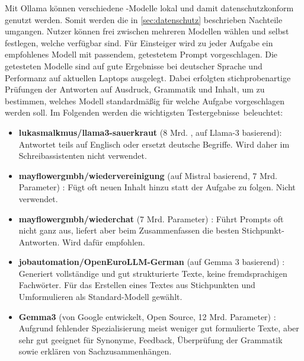 \documentclass[../main.tex]{subfiles}
\begin{document}
Mit Ollama können verschiedene -Modelle lokal und damit datenschutzkonform genutzt werden. Somit werden die in \autoref{sec:datenschutz} beschrieben Nachteile umgangen. 
Nutzer können frei zwischen mehreren Modellen wählen und selbst festlegen, welche verfügbar sind. Für Einsteiger wird zu jeder Aufgabe ein empfohlenes Modell mit passendem, 
getestetem Prompt vorgeschlagen. Die getesteten Modelle sind auf gute Ergebnisse bei deutscher Sprache und Performanz auf aktuellen Laptops ausgelegt. Dabei erfolgten stichprobenartige 
Prüfungen der Antworten auf Ausdruck, Grammatik und Inhalt, um zu bestimmen, welches Modell standardmäßig für welche Aufgabe vorgeschlagen werden soll. Im Folgenden werden die wichtigsten \mbox{Testergebnisse beleuchtet:}

\begin{itemize} \item \textbf{lukasmalkmus/llama3-sauerkraut} (8 Mrd. , auf Llama-3 basierend)\cite{sauerkraut}: Antwortet teils auf Englisch oder ersetzt deutsche Begriffe. Wird daher im Schreibassistenten nicht verwendet.

\item \textbf{mayflowergmbh/wiedervereinigung} (auf Mistral basierend, 7 Mrd. Parameter) \cite{wiedervereinigung}: Fügt oft neuen Inhalt hinzu statt der Aufgabe zu folgen. Nicht verwendet.

\item \textbf{mayflowergmbh/wiederchat} (7 Mrd. Parameter) \cite{wiederchat}: Führt Prompts oft nicht ganz aus, liefert aber beim Zusammenfassen die besten Stichpunkt-Antworten. Wird dafür empfohlen.

\item \textbf{jobautomation/OpenEuroLLM-German} (auf Gemma 3 basierend) \cite{openeurollm}: Generiert vollständige und gut strukturierte Texte, keine fremdsprachigen Fachwörter. Für das Erstellen eines Textes aus Stichpunkten und Umformulieren als Standard-Modell gewählt.

\item \textbf{Gemma3} (von Google entwickelt, Open Source, 12 Mrd. Parameter) \cite{gemma3}: Aufgrund fehlender Spezialisierung meist weniger gut formulierte Texte, aber sehr gut geeignet für Synonyme, Feedback, Überprüfung der Grammatik sowie erklären von Sachzusammenhängen. \end{itemize}
\end{document}

